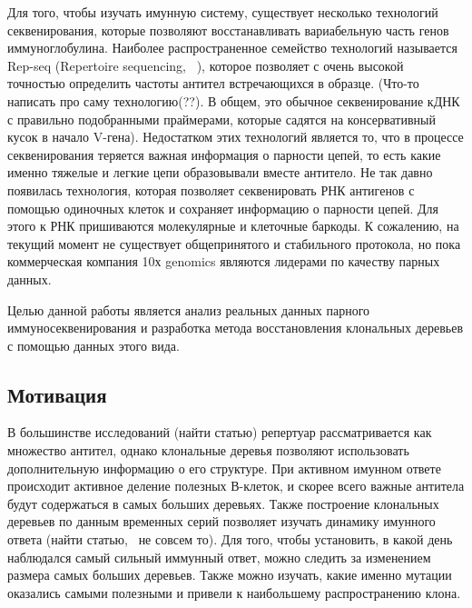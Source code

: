 \documentclass{spbau-diploma}
\begin{document}
Для того, чтобы изучать имунную систему, существует несколько технологий секвенирования, которые позволяют восстанавливать вариабельную часть генов иммуноглобулина. Наиболее распространенное семейство технологий называется Rep-seq (Repertoire sequencing, ~\cite{pmid22043864}), которое позволяет с очень высокой точностью определить частоты антител встречающихся в образце. (Что-то написать про саму технологию(??). В общем, это обычное секвенирование кДНК с правильно подобранными праймерами, которые садятся на консервативный кусок в начало V-гена). Недостатком этих технологий является то, что в процессе секвенирования теряется важная информация о парности цепей, то есть какие именно тяжелые и легкие цепи образовывали вместе антитело. Не так давно появилась технология, которая позволяет секвенировать РНК антигенов с помощью одиночных клеток и сохраняет информацию о парности цепей. Для этого к РНК пришиваются молекулярные и клеточные баркоды. К сожалению, на текущий момент не существует общепринятого и стабильного протокола, но пока коммерческая компания 10х genomics являются лидерами по качеству парных данных.

Целью данной работы является анализ реальных данных парного иммуносеквенирования и разработка метода восстановления клональных деревьев с помощью данных этого вида. 



\subsection{Мотивация}

В большинстве исследований (найти статью) репертуар рассматривается как множество антител, однако клональные деревья позволяют использовать дополнительную информацию о его структуре. При активном имунном ответе происходит активное деление полезных В-клеток, и скорее всего важные антитела будут содержаться в самых больших деревьях. Также построение клональных деревьев по данным временных серий позволяет изучать динамику имунного ответа (найти статью,~\cite{stern2014b} не совсем то). Для того, чтобы установить, в какой день наблюдался самый сильный иммунный ответ, можно следить за изменением размера самых больших деревьев. Также можно изучать, какие именно мутации оказались самыми полезными и привели к наибольшему распространению клона.     
\end{document}
